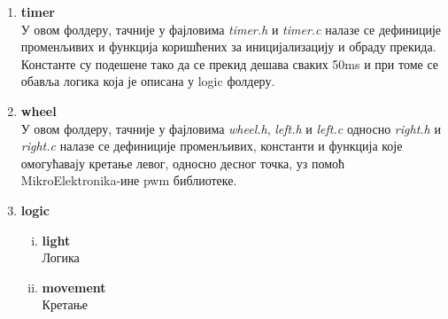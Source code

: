 \begin{enumerate}[1.]
	\item \textbf{timer}\\
	У овом фолдеру, тачније у фајловима \textit{timer.h} и \textit{timer.c} налазе се дефиниције променљивих и функција коришћених за иницијализацију и обраду прекида. Константе су подешене тако да се прекид дешава сваких 50ms и при томе се обавља логика која је описана у logic фолдеру.
	\item \textbf{wheel}\\
	У овом фолдеру, тачније у фајловима \textit{wheel.h}, \textit{left.h} и \textit{left.c} односно \textit{right.h} и \textit{right.c} налазе се дефиниције променљивих, константи и функција које омогућавају кретање левог, односно десног точка, уз помоћ MikroElektronika-ине pwm библиотеке. 
	\item \textbf{logic}\\
		\begin{enumerate}[i)]
			\item \textbf{light}\\
				Логика
			\item \textbf{movement}\\
				Кретање
		\end{enumerate}


\end{enumerate}

